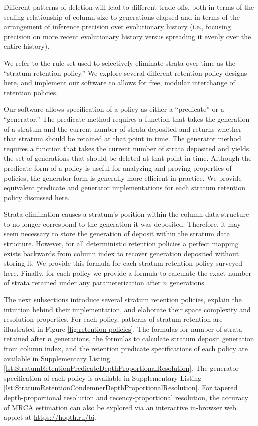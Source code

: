 Different patterns of deletion will lead to different trade-offs, both in terms of the scaling relationship of column size to generations elapsed and in terms of the arrangement of inference precision over evolutionary history (i.e., focusing precision on more recent evolutionary history versus spreading it evenly over the entire history).

We refer to the rule set used to selectively eliminate strata over time as the ``stratum retention policy.''
We explore several different retention policy designs here, and implement our software to allows for free, modular interchange of retention policies.

Our software allows specification of a policy as either a ``predicate'' or a ``generator.''
The predicate method requires a function that takes the generation of a stratum and the current number of strata deposited and returns whether that stratum should be retained at that point in time.
The generator method requires a function that takes the current number of strata deposited and yields the set of generations that should be deleted at that point in time.
Although the predicate form of a policy is useful for analyzing and proving properties of policies, the generator form is generally more efficient in practice.
We provide equivalent predicate and generator implementations for each stratum retention policy discussed here.

Strata elimination causes a stratum's position within the column data structure to no longer correspond to the generation it was deposited.
Therefore, it may seem necessary to store the generation of deposit within the stratum data structure.
However, for all deterministic retention policies a perfect mapping exists backwards from column index to recover generation deposited without storing it.
We provide this formula for each stratum retention policy surveyed here.
Finally, for each policy we provide a formula to calculate the exact number of strata retained under any parameterization after $n$ generations.

The next subsections introduce several stratum retention policies, explain the intuition behind their implementation, and elaborate their space complexity and resolution properties.
For each policy, patterns of stratum retention are illustrated in Figure \ref{fig:retention-policies}.
The formulas for number of strata retained after $n$ generations, the formulas to calculate stratum deposit generation from column index, and the retention predicate specifications of each policy are available in Supplementary Listing \ref{lst:StratumRetentionPredicateDepthProportionalResolution}.
The generator specification of each policy is available in Supplementary Listing \ref{lst:StratumRetentionCondemnerDepthProportionalResolution}.
For tapered depth-proportional resolution and recency-proportional resolution, the accuracy of MRCA estimation can also be explored via an interactive in-browser web applet at \url{https://hopth.ru/bi}.

